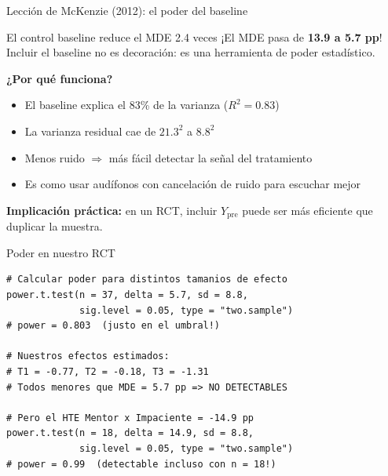 \documentclass[aspectratio=169, 11pt]{beamer}
\begin{document}
\begin{frame}{Lección de McKenzie (2012): el poder del baseline}
\begin{alertblock}{El control baseline reduce el MDE 2.4 veces}
¡El MDE pasa de \textbf{13.9 a 5.7 pp}! Incluir el baseline no es decoración: es una herramienta de poder estadístico.
\end{alertblock}

\vspace{0.3cm}
\textbf{¿Por qué funciona?}
\begin{itemize}\setlength{\itemsep}{4pt}
  \item El baseline explica el 83\% de la varianza ($R^2 = 0.83$)
  \item La varianza residual cae de $21.3^2$ a $8.8^2$
  \item Menos ruido $\Rightarrow$ más fácil detectar la señal del tratamiento
  \item Es como usar audífonos con cancelación de ruido para escuchar mejor
\end{itemize}

\vspace{0.3cm}
{\small \textbf{Implicación práctica:} en un RCT, incluir $Y_{\text{pre}}$ puede ser más eficiente que duplicar la muestra.}
\end{frame}

\begin{frame}[fragile]{Poder en nuestro RCT}
\begin{lstlisting}[basicstyle=\ttfamily\scriptsize]
# Calcular poder para distintos tamanios de efecto
power.t.test(n = 37, delta = 5.7, sd = 8.8,
             sig.level = 0.05, type = "two.sample")
# power = 0.803  (justo en el umbral!)

# Nuestros efectos estimados:
# T1 = -0.77, T2 = -0.18, T3 = -1.31
# Todos menores que MDE = 5.7 pp => NO DETECTABLES

# Pero el HTE Mentor x Impaciente = -14.9 pp
power.t.test(n = 18, delta = 14.9, sd = 8.8,
             sig.level = 0.05, type = "two.sample")
# power = 0.99  (detectable incluso con n = 18!)
\end{lstlisting}
\end{frame}
\end{document}
